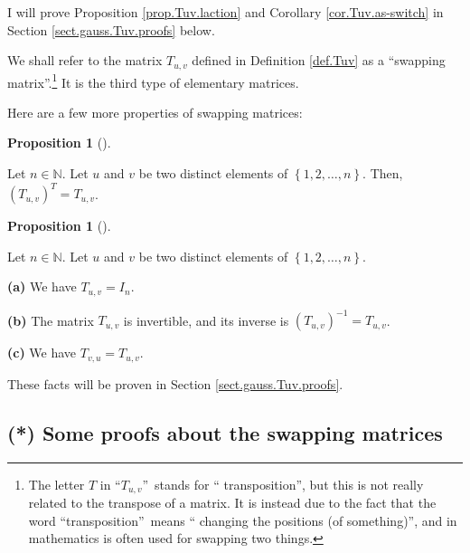 \documentclass[numbers=enddot,12pt,final,onecolumn,notitlepage]{scrartcl}%
\theoremstyle{definition}
\newtheorem{prop}[theo]{Proposition}
\newenvironment{proposition}[1][]
{\begin{prop}[#1]\begin{leftbar}}
{\end{leftbar}\end{prop}}
\begin{document}
I will prove Proposition \ref{prop.Tuv.laction} and Corollary
\ref{cor.Tuv.as-switch} in Section \ref{sect.gauss.Tuv.proofs} below.

We shall refer to the matrix $T_{u,v}$ defined in Definition \ref{def.Tuv} as
a \textquotedblleft swapping matrix\textquotedblright.\footnote{The letter $T$
in \textquotedblleft$T_{u,v}$\textquotedblright\ stands for \textquotedblleft
transposition\textquotedblright, but this is not really related to the
transpose of a matrix. It is instead due to the fact that the word
\textquotedblleft transposition\textquotedblright\ means \textquotedblleft
changing the positions (of something)\textquotedblright, and in mathematics is
often used for swapping two things.} It is the third type of elementary matrices.

Here are a few more properties of swapping matrices:

\begin{proposition}
\label{prop.Tuv.transpose}Let $n\in\mathbb{N}$. Let $u$ and $v$ be two
distinct elements of $\left\{  1,2,\ldots,n\right\}  $. Then, $\left(
T_{u,v}\right)  ^{T}=T_{u,v}$.
\end{proposition}

\begin{proposition}
\label{prop.Tuv.lambda+mu}Let $n\in\mathbb{N}$. Let $u$ and $v$ be two
distinct elements of $\left\{  1,2,\ldots,n\right\}  $.

\textbf{(a)} We have $T_{u,v}=I_{n}$.

\textbf{(b)} The matrix $T_{u,v}$ is invertible, and its inverse is $\left(
T_{u,v}\right)  ^{-1}=T_{u,v}$.

\textbf{(c)} We have $T_{v,u}=T_{u,v}$.
\end{proposition}

These facts will be proven in Section \ref{sect.gauss.Tuv.proofs}.

\subsection{\label{sect.gauss.Tuv.proofs}(*) Some proofs about the swapping
matrices}
\end{document}
